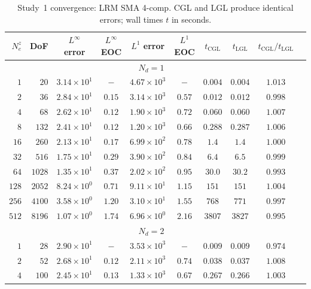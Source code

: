 \begin{table}[htbp]
\centering
\caption{Study~1 convergence: LRM SMA 4-comp. CGL and LGL produce identical errors; wall times $t$ in seconds.}
\label{tab:study1_SMA_4comp}
\small
\begin{tabular}{rr ccc cc cc c}
\toprule
$N_e^z$ & DoF & $L^\infty$ error & $L^\infty$ EOC & $L^1$ error & $L^1$ EOC & $t_\text{CGL}$ & $t_\text{LGL}$ & $t_\text{CGL}/t_\text{LGL}$ \\
\midrule
\midrule
\multicolumn{9}{c}{\textbf{$N_d = 1$}} \\
\midrule
$1$ & $20$ & $3.14\times 10^{1}$ & $-$ & $4.67\times 10^{3}$ & $-$ & $0.004$ & $0.004$ & $1.013$ \\
$2$ & $36$ & $2.84\times 10^{1}$ & $0.15$ & $3.14\times 10^{3}$ & $0.57$ & $0.012$ & $0.012$ & $0.998$ \\
$4$ & $68$ & $2.62\times 10^{1}$ & $0.12$ & $1.90\times 10^{3}$ & $0.72$ & $0.060$ & $0.060$ & $1.007$ \\
$8$ & $132$ & $2.41\times 10^{1}$ & $0.12$ & $1.20\times 10^{3}$ & $0.66$ & $0.288$ & $0.287$ & $1.006$ \\
$16$ & $260$ & $2.13\times 10^{1}$ & $0.17$ & $6.99\times 10^{2}$ & $0.78$ & $1.4$ & $1.4$ & $1.000$ \\
$32$ & $516$ & $1.75\times 10^{1}$ & $0.29$ & $3.90\times 10^{2}$ & $0.84$ & $6.4$ & $6.5$ & $0.999$ \\
$64$ & $1028$ & $1.35\times 10^{1}$ & $0.37$ & $2.02\times 10^{2}$ & $0.95$ & $30.0$ & $30.2$ & $0.993$ \\
$128$ & $2052$ & $8.24\times 10^{0}$ & $0.71$ & $9.11\times 10^{1}$ & $1.15$ & $151$ & $151$ & $1.004$ \\
$256$ & $4100$ & $3.58\times 10^{0}$ & $1.20$ & $3.10\times 10^{1}$ & $1.55$ & $768$ & $771$ & $0.997$ \\
$512$ & $8196$ & $1.07\times 10^{0}$ & $1.74$ & $6.96\times 10^{0}$ & $2.16$ & $3807$ & $3827$ & $0.995$ \\
\midrule
\multicolumn{9}{c}{\textbf{$N_d = 2$}} \\
\midrule
$1$ & $28$ & $2.90\times 10^{1}$ & $-$ & $3.53\times 10^{3}$ & $-$ & $0.009$ & $0.009$ & $0.974$ \\
$2$ & $52$ & $2.68\times 10^{1}$ & $0.12$ & $2.11\times 10^{3}$ & $0.74$ & $0.038$ & $0.037$ & $1.008$ \\
$4$ & $100$ & $2.45\times 10^{1}$ & $0.13$ & $1.33\times 10^{3}$ & $0.67$ & $0.267$ & $0.266$ & $1.003$ \\

\end{tabular}
\end{table}
